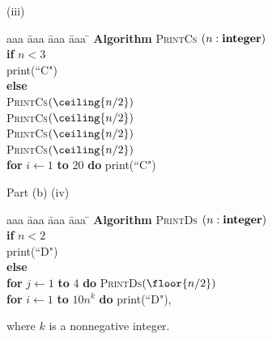 \documentclass{article}
\begin{document}
\begin{problem}
\vskip 0.2in
\noindent
(iii)\ \ 
\begin{minipage}[t]{3in}
\begin{tabbing}
aaa \= aaa \= aaa \= aaa \=  \kill
\textbf{Algorithm} \textsc{PrintCs} $(n: \mbox{\bf integer})$ \\
          \> \textbf{if} $n < 3$ \\
          \>\>  print(``C") \\
          \>\textbf{else} \\
          \>\>  \textsc{PrintCs}$(\ceiling{n/2})$\\
          \>\>  \textsc{PrintCs}$(\ceiling{n/2})$\\
          \>\>  \textsc{PrintCs}$(\ceiling{n/2})$\\
          \>\>  \textsc{PrintCs}$(\ceiling{n/2})$\\
      \>\> \textbf{for} $i \leftarrow 1$ \textbf{to} $20$ \textbf{do} print(``C")
\end{tabbing}
\end{minipage}

\vskip 0.3in
\noindent
Part (b)
\vskip 0.2in
(iv)\ \
\begin{minipage}[t]{3in}
\begin{tabbing}
aaa \= aaa \= aaa \= aaa \=  \kill
\textbf{Algorithm} \textsc{PrintDs} $(n: \mbox{\bf integer})$ \\
          \> \textbf{if} $n < 2$ \\
          \>\>  print(``D") \\
          \>\textbf{else} \\
          \>\>  \textbf{for} $j \leftarrow 1$ \textbf{to} $4$ 
					\textbf{do} \textsc{PrintDs}$(\floor{n/2})$\\
      \>\> \textbf{for} $i \leftarrow 1$ \textbf{to} $10n^k$ \textbf{do} print(``D"),
\end{tabbing}
      where $k$ is a nonnegative integer.

\end{minipage}
\end{problem}
\end{document}
